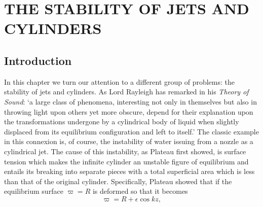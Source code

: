 \chapter{THE STABILITY OF JETS AND CYLINDERS}
\label{ch:12}

\section{Introduction}\label{sec:107}
In this chapter we turn our attention to a different group of problems: the stability of jets and cylinders. As Lord Rayleigh has remarked in his \emph{Theory of Sound}: `a large class of phenomena, interesting not only in themselves but also in throwing light upon others yet more obscure, depend for their explanation upon the transformations undergone by a cylindrical body of liquid when slightly displaced from its equilibrium configuration and left to itself.' The classic example in this connexion is, of course, the instability of water issuing from a nozzle as a cylindrical jet. The cause of this instability, as Plateau first showed, is surface tension which makes the infinite cylinder an unstable figure of equilibrium and entails its breaking into separate pieces with a total superficial area which is less than that of the original cylinder. Specifically, Plateau showed that if the equilibrium surface $\varpi = R$ is deformed so that it becomes
\begin{equation}
\label{eq:12-1}
\varpi = R + \epsilon \cos kz,
\end{equation}
